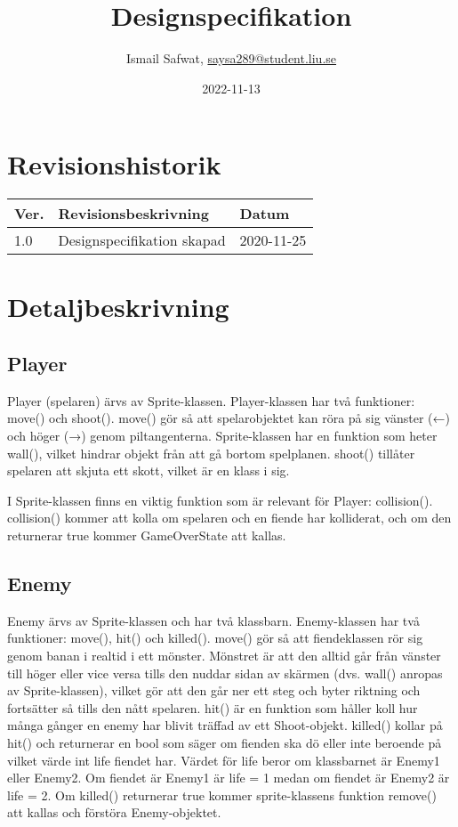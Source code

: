 \documentclass{TDP005mall}
\author{
  Ismail Safwat, \url{saysa289@student.liu.se}}
\title{Designspecifikation}
\date{2022-11-13}
\begin{document}
\projectpage
\section{Revisionshistorik}
\begin{table}[!h]
\begin{tabularx}{\linewidth}{|l|X|l|}
\hline
Ver. & Revisionsbeskrivning & Datum \\\hline
1.0 & Designspecifikation skapad & 2020-11-25 \\\hline
\end{tabularx}
\end{table}


\section{Detaljbeskrivning}
\subsection{Player}
Player (spelaren) ärvs av Sprite-klassen. Player-klassen har två funktioner: move() och shoot(). move() gör så att spelarobjektet kan röra på sig vänster (←) och höger (→) genom piltangenterna. Sprite-klassen har en funktion som heter wall(), vilket hindrar objekt från att gå bortom spelplanen. shoot() tillåter spelaren att skjuta ett skott, vilket är en klass i sig.

I Sprite-klassen finns en viktig funktion som är relevant för Player: collision(). collision() kommer att kolla om spelaren och en fiende har kolliderat, och om den returnerar true kommer GameOverState att kallas. 

\subsection{Enemy}
Enemy ärvs av Sprite-klassen och har två klassbarn. Enemy-klassen har två funktioner: move(), hit() och killed(). move() gör så att fiendeklassen rör sig genom banan i realtid i ett mönster. Mönstret är att den alltid går från vänster till höger eller vice versa tills den nuddar sidan av skärmen (dvs. wall() anropas av Sprite-klassen), vilket gör att den går ner ett steg och byter riktning och fortsätter så tills den nått spelaren. hit() är en funktion som håller koll hur många gånger en enemy har blivit träffad av ett Shoot-objekt. killed() kollar på hit() och returnerar en bool som säger om fienden ska dö eller inte beroende på vilket värde int life fiendet har. Värdet för life beror om klassbarnet är Enemy1 eller Enemy2. Om fiendet är Enemy1 är life = 1 medan om fiendet är Enemy2 är life = 2. Om killed() returnerar true kommer sprite-klassens funktion remove() att kallas och förstöra Enemy-objektet.
\end{document}
